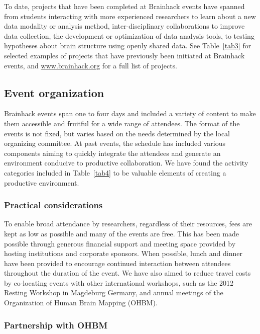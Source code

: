 \documentclass[11pt]{bmc_article_s50}
\begin{document}
To date, projects that have been completed at Brainhack events have spanned from students interacting with more experienced researchers to learn about a new data modality or analysis method, inter-disciplinary collaborations to improve data collection, the development or optimization of data analysis tools, to testing hypotheses about brain structure using openly shared data. See Table~\ref{tab3} for selected examples of projects that have previously been initiated at Brainhack events, and \href{http://www.brainhack.org}{www.brainhack.org} for a full list of projects.

\subsection{Event organization}

Brainhack events span one to four days and included a variety of content to make them accessible and fruitful for a wide range of attendees. The format of the events is not fixed, but varies based on the needs determined by the local organizing committee. At past events, the schedule has included various components aiming to quickly integrate the attendees and generate an environment conducive to productive collaboration. We have found the activity categories included in Table~\ref{tab4} to be valuable elements of creating a productive environment. 

\subsubsection{Practical considerations}

To enable broad attendance by researchers, regardless of their resources, fees are kept as low as possible and many of the events are free. This has been made possible through generous financial support and meeting space provided by hosting institutions and corporate sponsors. When possible, lunch and dinner have been provided to encourage continued interaction between attendees throughout the duration of the event. We have also aimed to reduce travel costs by co-locating events with other international workshops, such as the 2012 Resting Workshop in Magdeburg Germany, and annual meetings of the Organization of Human Brain Mapping (OHBM). 

\subsubsection{Partnership with OHBM}
\end{document}
